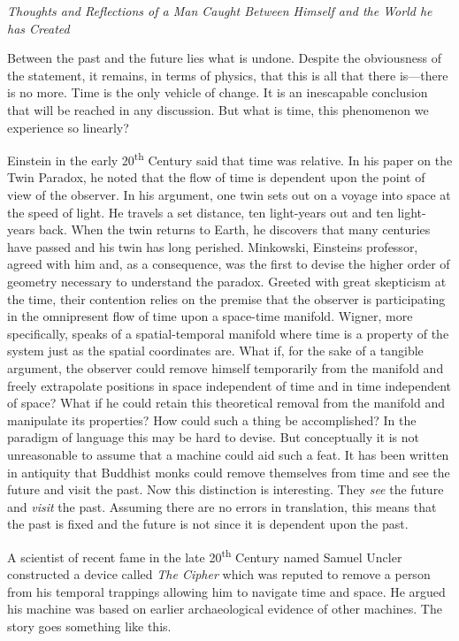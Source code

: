 \emph{Thoughts and Reflections of a Man Caught Between Himself and the
World he has Created}

Between the past and the future lies what is undone. Despite the
obviousness of the statement, it remains, in terms of physics, that this
is all that there is---there is no more. Time is the only vehicle of
change. It is an inescapable conclusion that will be reached in any
discussion. But what is time, this phenomenon we experience so linearly?

Einstein in the early 20\textsuperscript{th} Century said that time was
relative. In his paper on the Twin Paradox, he noted that the flow of
time is dependent upon the point of view of the observer. In his
argument, one twin sets out on a voyage into space at the speed of
light. He travels a set distance, ten light-years out and ten
light-years back. When the twin returns to Earth, he discovers that many
centuries have passed and his twin has long perished. Minkowski,
Einstein\textquotesingle s professor, agreed with him and, as a
consequence, was the first to devise the higher order of geometry
necessary to understand the paradox. Greeted with great skepticism at
the time, their contention relies on the premise that the observer is
participating in the omnipresent flow of time upon a space-time
manifold. Wigner, more specifically, speaks of a spatial-temporal
manifold where time is a property of the system just as the spatial
coordinates are. What if, for the sake of a tangible argument, the
observer could remove himself temporarily from the manifold and freely
extrapolate positions in space independent of time and in time
independent of space? What if he could retain this theoretical removal
from the manifold and manipulate its properties? How could such a thing
be accomplished? In the paradigm of language this may be hard to devise.
But conceptually it is not unreasonable to assume that a machine could
aid such a feat. It has been written in antiquity that Buddhist monks
could remove themselves from time and see the future and visit the past.
Now this distinction is interesting. They \emph{see} the future and
\emph{visit} the past. Assuming there are no errors in translation, this
means that the past is fixed and the future is not since it is dependent
upon the past.

A scientist of recent fame in the late 20\textsuperscript{th} Century
named Samuel Uncler constructed a device called \emph{The Cipher} which
was reputed to remove a person from his temporal trappings allowing him
to navigate time and space. He argued his machine was based on earlier
archaeological evidence of other machines. The story goes something like
this.


